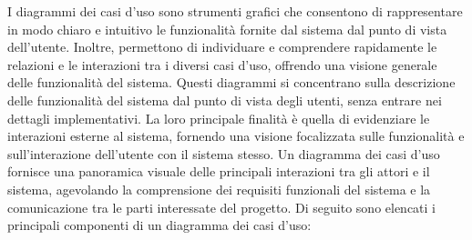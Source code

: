 I diagrammi dei casi d'uso sono strumenti grafici che consentono di rappresentare in modo chiaro e intuitivo le funzionalità fornite dal sistema dal punto di vista dell'utente. Inoltre, permettono di individuare e comprendere rapidamente le relazioni e le interazioni tra i diversi casi d'uso, offrendo una visione generale delle funzionalità del sistema.
Questi diagrammi si concentrano sulla descrizione delle funzionalità del sistema dal punto di vista degli utenti, senza entrare nei dettagli implementativi. La loro principale finalità è quella di evidenziare le interazioni esterne al sistema, fornendo una visione focalizzata sulle funzionalità e sull'interazione dell'utente con il sistema stesso.
Un diagramma dei casi d'uso fornisce una panoramica visuale delle principali interazioni tra gli attori e il sistema, agevolando la comprensione dei requisiti funzionali del sistema e la comunicazione tra le parti interessate del progetto.
Di seguito sono elencati i principali componenti di un diagramma dei casi d'uso:
